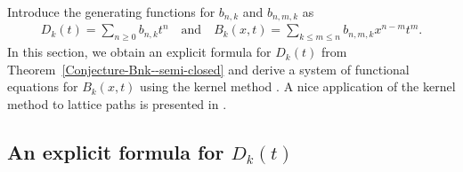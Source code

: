 \documentclass[reqno, 12pt]{article}
\theoremstyle{mydefinition}
\theoremstyle{myremark}
\numberwithin{algorithm}{section}
\begin{document}
Introduce the generating functions for $b_{n,k}$ and $b_{n,m,k}$ as
\begin{align*}
D_k(t)=\sum_{n\geq 0} b_{n,k} t^n\quad\text{and}\quad B_k(x,t)=\sum_{k\leq m\leq n} b_{n,m,k} x^{n-m} t^m.
\end{align*}
In this section, we obtain an explicit formula for $D_k(t)$ from Theorem~\ref{Conjecture-Bnk--semi-closed} and derive a system of functional equations for $B_k(x,t)$ using the kernel method \cite{Bousquet2000}.
A nice application of the kernel method to lattice paths is presented in \cite{C.Banderier2002}.


\subsection{An explicit formula for $D_k(t)$}\label{subsection-explicite-gf}
\end{document}
